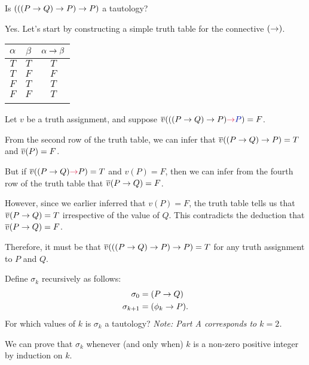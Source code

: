 
\begin{problem}
  \begin{enumalph}
    \item Is $(((P \rightarrow Q) \rightarrow P) \rightarrow P)$ a tautology?
      \begin{Answer}
        Yes. Let's start by constructing a simple truth table for
        the connective $(\rightarrow)$.

        \step
        \begin{center}
          \begin{tabular}{c c c}
            \bottomrule
            $\alpha$ & $\beta$ & $\alpha \rightarrow \beta$\\
            \midrule
            $T$ & $T$ & $T$\\
            \midrule
            $T$ & $F$ & $F$\\
            \midrule
            $F$ & $T$ & $T$\\
            \midrule
            $F$ & $F$ & $T$\\
            \toprule\\    
          \end{tabular}
        \end{center}
        Let $v$ be a truth assignment, and suppose
        $\vbar(((P \lto Q) \lto P) \crim{\lto} \zaff{P}) = F$.

        \noindent
        From the second row of the truth table, we can infer that $\overline{v}((P \rightarrow Q) \rightarrow P) = T$ and $\overline{v}(P) = F$.

        \noindent
        But if $\vbar((P \lto Q) \crim{\lto} P) = T$ and $v(P) = F$,
        then we can infer from the fourth row of the truth table that $\overline{v}(P \rightarrow Q) = F$.

        \noindent
        However, since we earlier inferred that $v(P) = F$,
        the truth table tells us that $\overline{v}(P \rightarrow Q) = T$
        irrespective of the value of $Q$.
        This contradicts the deduction that $\overline{v}(P \rightarrow Q) = F$.
        
        \step
        Therefore, it must be that $\overline{v}(((P \rightarrow Q) \rightarrow P) \rightarrow P) = T$
        for any truth assignment to $P$ and $Q$.
      \end{Answer}
    \item Define $\sigma_k$ recursively as follows:
      \begin{align*}
        \sigma_0 &= (P \rightarrow Q) \\
        \sigma_{k+1} &= (\phi_k \rightarrow P).
      \end{align*}
      For which values of $k$ is $\sigma_k$ a tautology?
      \emph{Note: Part A corresponds to $k=2$.}
      \begin{Answer}
        We can prove that $\sigma_k$ whenever (and only when) $k$ is a non-zero positive integer
        by induction on $k$.
        

\end{Answer}
\end{enumalph}
\end{problem}
